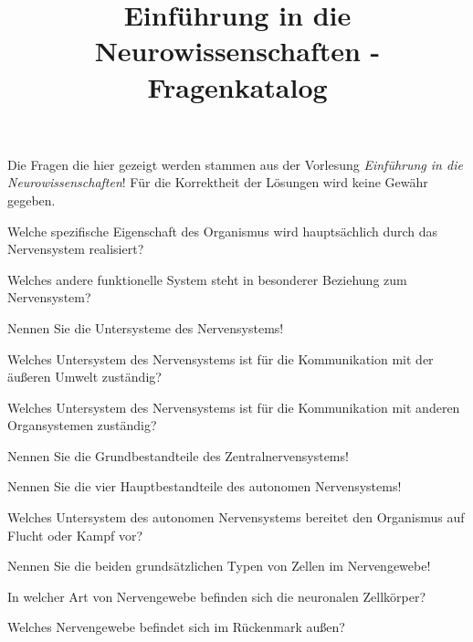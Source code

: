 \documentclass[10pt, a4paper]{exam}
\title{Einführung in die Neurowissenschaften - Fragenkatalog}
\author{}
\date{}
\begin{document}
\begin{myboxii}[Disclaimer]
  Die Fragen die hier gezeigt werden stammen aus der Vorlesung \textit{Einführung in die Neurowissenschaften}! Für die Korrektheit der Lösungen wird keine Gewähr gegeben.
\end{myboxii}

\begin{questions}
  \question Welche spezifische Eigenschaft des Organismus wird hauptsächlich durch das Nervensystem realisiert?
  \begin{solution}
  \end{solution}
  \question Welches andere funktionelle System steht in besonderer Beziehung zum Nervensystem?
  \begin{solution}
  \end{solution}
  \question Nennen Sie die Untersysteme des Nervensystems!
  \begin{solution}
  \end{solution}
  \question Welches Untersystem des Nervensystems ist für die Kommunikation mit der äußeren Umwelt zuständig?
  \begin{solution}
  \end{solution}
  \question Welches Untersystem des Nervensystems ist für die Kommunikation mit anderen Organsystemen zuständig?
  \begin{solution}
  \end{solution}
  \question Nennen Sie die Grundbestandteile des Zentralnervensystems!
  \begin{solution}
  \end{solution}
  \question Nennen Sie die vier Hauptbestandteile des autonomen Nervensystems!
  \begin{solution}
  \end{solution}
  \question Welches Untersystem des autonomen Nervensystems bereitet den Organismus auf Flucht oder Kampf vor?
  \begin{solution}
  \end{solution}
  \question Nennen Sie die beiden grundsätzlichen Typen von Zellen im Nervengewebe!
  \begin{solution}
  \end{solution}
  \question In welcher Art von Nervengewebe befinden sich die neuronalen Zellkörper?
  \begin{solution}
  \end{solution}
  \question Welches Nervengewebe befindet sich im Rückenmark außen?
  \begin{solution}

\end{solution}
\end{questions}
\end{document}
